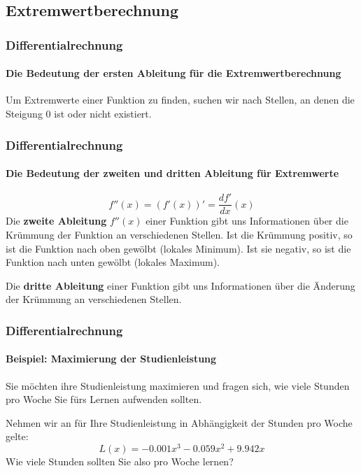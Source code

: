 \documentclass{beamer}
\begin{document}
\subsection{Extremwertberechnung}
\begin{frame}
  \frametitle{Differentialrechnung}
  \framesubtitle{Die Bedeutung der ersten Ableitung für die Extremwertberechnung}

Um Extremwerte einer Funktion zu finden, suchen wir nach Stellen, an denen die Steigung $0$ ist oder nicht existiert.
 
  
  
\end{frame}

\begin{frame}
  \frametitle{Differentialrechnung}
  \framesubtitle{Die Bedeutung der zweiten und dritten Ableitung für Extremwerte}
  $$f''(x) = (f'(x))'=\frac{d f'}{dx}(x)$$
  Die \textbf{zweite Ableitung} $f''(x)$ einer Funktion gibt uns Informationen über die Krümmung der Funktion an verschiedenen Stellen. Ist die Krümmung positiv, so ist die Funktion nach oben gewölbt (lokales Minimum). Ist sie negativ, so ist die Funktion nach unten gewölbt (lokales Maximum).

  \vspace{1em}

  Die \textbf{dritte Ableitung} einer Funktion gibt uns Informationen über die Änderung der Krümmung an verschiedenen Stellen.  
\end{frame}

\begin{frame}
  \frametitle{Differentialrechnung}
  \framesubtitle{Beispiel: Maximierung der Studienleistung}
    Sie möchten ihre Studienleistung maximieren und fragen sich, wie viele Stunden pro Woche Sie 
    fürs Lernen aufwenden sollten. 

    Nehmen wir an für Ihre Studienleistung in Abhängigkeit der Stunden pro Woche gelte:
    $$L(x)=-0.001x^3-0.059x^2+9.942x$$
  Wie viele Stunden sollten Sie also pro Woche lernen?
\end{frame}
\end{document}
